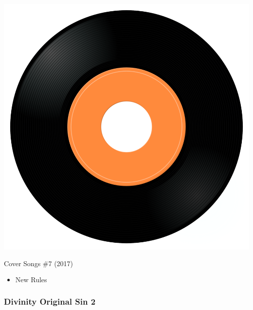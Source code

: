 \begin{minipage}[t]{0.25\textwidth}\vspace{0pt}
\captionsetup{type=figure}
\includegraphics[width=\textwidth]{Images/cover.png}
\caption*{Cover Songs \#7 (2017)}
\end{minipage}
\begin{minipage}[t]{0.25\textwidth}\vspace{0pt}
\begin{itemize}[nosep,leftmargin=1em,labelwidth=*,align=left]
	\setlength{\itemsep}{0pt}
	\item New Rules
\end{itemize}
\end{minipage}

\subsubsection{Divinity Original Sin 2}

